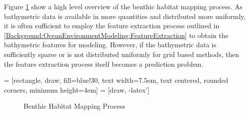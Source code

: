 		\FloatBarrier			
		
		Figure \ref{Figure:BenthicHabitatMappingProcess} show a high level overview of the benthic habitat mapping process. As bathymetric data is available in more quantities and distributed more uniformly, it is often sufficient to employ the feature extraction process outlined in \cref{Background:OceanEnvironmentModeling:FeatureExtraction} to obtain the bathymetric features for modeling. However, if the bathymetric data is sufficiently sparse or is not distributed uniformly for grid based methods, then the feature extraction process itself becomes a prediction problem.

				

		 = [rectangle, draw, fill=blue!30,
		    text width=7.5em, text centered, rounded corners, minimum height=4em]
		 = [draw, -latex']
	
		\begin{figure}[!ht]
		\centering{}		
		\caption{Benthic Habitat Mapping Process}
		\label{Figure:BenthicHabitatMappingProcess}
		\end{figure}	
			
